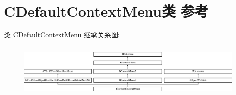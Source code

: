 \hypertarget{class_c_default_context_menu}{}\section{C\+Default\+Context\+Menu类 参考}
\label{class_c_default_context_menu}
类 C\+Default\+Context\+Menu 继承关系图\+:\begin{figure}[H]
\begin{center}
\leavevmode
\includegraphics[height=2.651515cm]{class_c_default_context_menu}
\end{center}
\end{figure}
